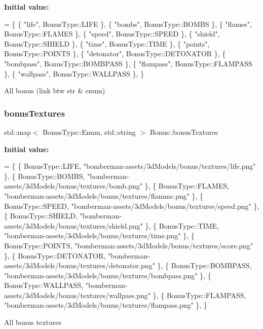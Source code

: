 {\bfseries Initial value\+:}
\begin{DoxyCode}
= \{
    \{ \textcolor{stringliteral}{"life"}, BonusType::LIFE \},
    \{ \textcolor{stringliteral}{"bombs"}, BonusType::BOMBS \},
    \{ \textcolor{stringliteral}{"flames"}, BonusType::FLAMES \},
    \{ \textcolor{stringliteral}{"speed"}, BonusType::SPEED \},
    \{ \textcolor{stringliteral}{"shield"}, BonusType::SHIELD \},
    \{ \textcolor{stringliteral}{"time"}, BonusType::TIME \},
    \{ \textcolor{stringliteral}{"points"}, BonusType::POINTS \},
    \{ \textcolor{stringliteral}{"detonator"}, BonusType::DETONATOR \},
    \{ \textcolor{stringliteral}{"bombpass"}, BonusType::BOMBPASS \},
    \{ \textcolor{stringliteral}{"flampass"}, BonusType::FLAMPASS \},
    \{ \textcolor{stringliteral}{"wallpass"}, BonusType::WALLPASS \},
\}
\end{DoxyCode}
All bonus (link btw str \& enum) \mbox{\label{class_bonus_ad5d507d977155bd7d9a027e77b51b29c}} 
\subsubsection{\texorpdfstring{bonus\+Textures}{bonusTextures}}
{\footnotesize\ttfamily std\+::map$<$ Bonus\+Type\+::\+Enum, std\+::string $>$ Bonus\+::bonus\+Textures\hspace{0.3cm}{\ttfamily [static]}}

{\bfseries Initial value\+:}
\begin{DoxyCode}
= \{
    \{ BonusType::LIFE, \textcolor{stringliteral}{"bomberman-assets/3dModels/bonus/textures/life.png"} \},
    \{ BonusType::BOMBS, \textcolor{stringliteral}{"bomberman-assets/3dModels/bonus/textures/bomb.png"} \},
    \{ BonusType::FLAMES, \textcolor{stringliteral}{"bomberman-assets/3dModels/bonus/textures/flamme.png"} \},
    \{ BonusType::SPEED, \textcolor{stringliteral}{"bomberman-assets/3dModels/bonus/textures/speed.png"} \},
    \{ BonusType::SHIELD, \textcolor{stringliteral}{"bomberman-assets/3dModels/bonus/textures/shield.png"} \},
    \{ BonusType::TIME, \textcolor{stringliteral}{"bomberman-assets/3dModels/bonus/textures/time.png"} \},
    \{ BonusType::POINTS, \textcolor{stringliteral}{"bomberman-assets/3dModels/bonus/textures/score.png"} \},
    \{ BonusType::DETONATOR, \textcolor{stringliteral}{"bomberman-assets/3dModels/bonus/textures/detonator.png"} \},
    \{ BonusType::BOMBPASS, \textcolor{stringliteral}{"bomberman-assets/3dModels/bonus/textures/bombpass.png"} \},
    \{ BonusType::WALLPASS, \textcolor{stringliteral}{"bomberman-assets/3dModels/bonus/textures/wallpass.png"} \},
    \{ BonusType::FLAMPASS, \textcolor{stringliteral}{"bomberman-assets/3dModels/bonus/textures/flampass.png"} \},
\}
\end{DoxyCode}
All bonus textures \mbox{\label{class_bonus_a4d328bd69b4cbae25312758d68991e26}} 
